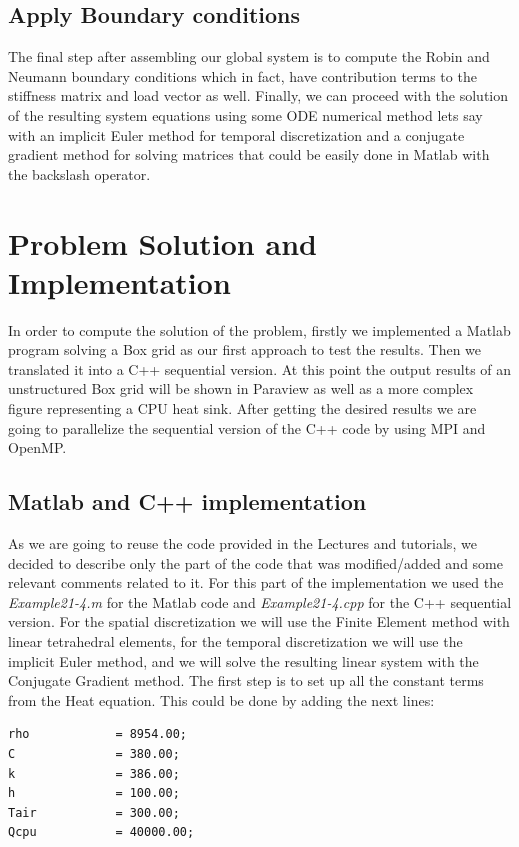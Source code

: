 \documentclass[12pt]{article}
\begin{document}
\subsection{Apply Boundary conditions}

The final step after assembling our global system is to compute the Robin and Neumann boundary conditions which in fact, have contribution terms to the stiffness matrix and load vector as well. Finally, we can proceed with the solution of the resulting system equations using some ODE numerical method lets say with an implicit Euler method for temporal discretization and a conjugate gradient method for solving matrices that could be easily done in Matlab with the backslash operator.

\section{Problem Solution and Implementation}

In order to compute the solution of the problem, firstly we implemented a Matlab program solving a Box grid as our first approach to test the results. Then we translated it into a C++ sequential version. At this point the output results of an unstructured Box grid will be shown in Paraview as well as a more complex figure representing a CPU heat sink. After getting the desired results we are going to parallelize the sequential version of the C++ code by using MPI and OpenMP.

\subsection{Matlab and C++ implementation}
As we are going to reuse the code provided in the Lectures and tutorials, we decided to describe only the part of the code that was modified/added and some relevant comments related to it. For this part of the implementation we used the \textit{Example21-4.m} for the Matlab code and \textit{Example21-4.cpp} for the C++ sequential version. For the spatial discretization we will use the Finite Element method with linear tetrahedral elements, for the temporal discretization we will use the implicit Euler method, and we will solve the resulting linear system with the Conjugate Gradient method. The first step is to set up all the constant terms from the Heat equation. This could be done by adding the next lines:

\begin{lstlisting}
rho            = 8954.00;
C              = 380.00;
k              = 386.00;
h              = 100.00;
Tair           = 300.00;
Qcpu           = 40000.00;
\end{lstlisting}
\end{document}

